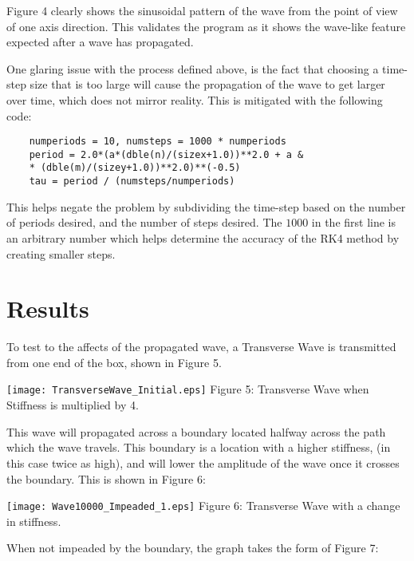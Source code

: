 \documentclass{article}
\begin{document}
\begin{multicols}{2}
Figure 4 clearly shows the sinusoidal pattern of the wave from the point of view of one axis direction. This validates the program as it shows the wave-like feature expected after a wave has propagated.

One glaring issue with the process defined above, is the fact that choosing a time-step size that is too large will cause the propagation of the wave to get larger over time, which does not mirror reality. This is mitigated with the following code:

\vspace{0.1in}

\begin{verbatim}
	numperiods = 10, numsteps = 1000 * numperiods
    period = 2.0*(a*(dble(n)/(sizex+1.0))**2.0 + a &
    * (dble(m)/(sizey+1.0))**2.0)**(-0.5) 
    tau = period / (numsteps/numperiods)
\end{verbatim}

This helps negate the problem by subdividing the time-step based on the number of periods desired, and the number of steps desired. The $1000$ in the first line is an arbitrary number which helps determine the accuracy of the RK4 method by creating smaller steps.

\section{Results}

To test to the affects of the propagated wave, a Transverse Wave is transmitted from one end of the box, shown in Figure 5.

\begin{center}
\texttt{[image: TransverseWave\_Initial.eps]}
\scriptsize{
Figure 5: Transverse Wave when Stiffness is multiplied by 4.
}
\end{center}

This wave will propagated across a boundary located halfway across the path which the wave travels. This boundary is a location with a higher stiffness, (in this case twice as high), and will lower the amplitude of the wave once it crosses the boundary. This is shown in Figure 6:

\begin{center}
\texttt{[image: Wave10000\_Impeaded\_1.eps]}
\scriptsize{
Figure 6: Transverse Wave with a change in stiffness.
}
\end{center}

When not impeaded by the boundary, the graph takes the form of Figure 7:


\end{multicols}
\end{document}
